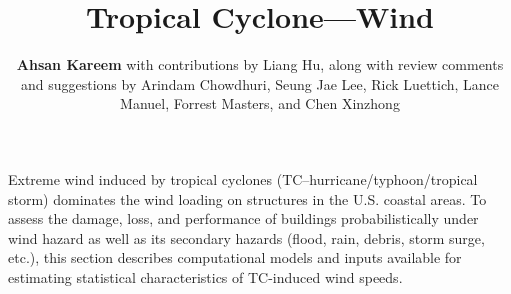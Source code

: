 %
%
%


%
%
%
%
%
%
%
%

\title{Tropical Cyclone---Wind}
\author{
    \textbf{Ahsan Kareem}
    with contributions by Liang Hu,
    \newline
    along with review comments and suggestions by Arindam Chowdhuri, Seung Jae Lee, Rick Luettich, Lance Manuel, Forrest Masters, and Chen Xinzhong
}
\tocauthor{}
%
%
\maketitle

Extreme wind induced by tropical cyclones (TC--hurricane/typhoon/tropical storm) dominates the wind loading on structures in the U.S. coastal areas. To assess the damage, loss, and performance of buildings probabilistically under wind hazard as well as its secondary hazards (flood, rain, debris, storm surge, etc.), this section describes computational models and inputs available for estimating statistical characteristics of TC-induced wind speeds. 

